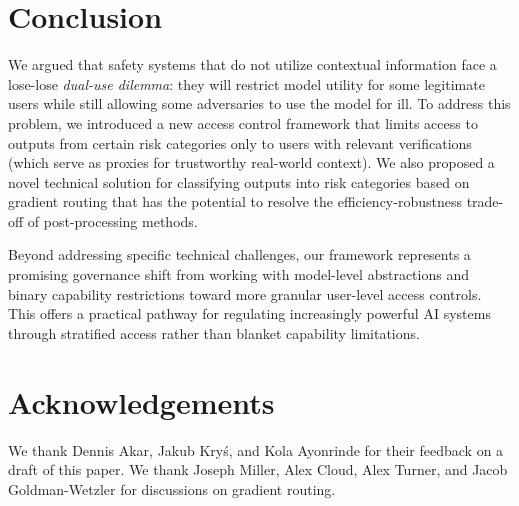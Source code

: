 \documentclass{article}
\theoremstyle{plain}
\theoremstyle{definition}
\theoremstyle{remark}
\begin{document}
\section{Conclusion}

We argued that safety systems that do not utilize contextual
information face a lose-lose \emph{dual-use dilemma}: they will
restrict model utility for some legitimate users while still allowing
some adversaries to use the model for ill. To address this problem,
we introduced a new access control framework that limits access to
outputs from certain risk categories only to users with relevant
verifications (which serve as proxies for trustworthy real-world
context). We also proposed a novel technical solution for classifying
outputs into risk categories based on gradient routing that has the
potential to resolve the efficiency-robustness trade-off of
post-processing methods.

Beyond addressing specific technical challenges, our framework
represents a promising governance shift from working with model-level
abstractions and binary capability restrictions toward more granular
user-level access controls. This offers a practical pathway for
regulating increasingly powerful AI systems through stratified access
rather than blanket capability limitations.

\section{Acknowledgements}

We thank Dennis Akar, Jakub Kryś, and Kola Ayonrinde for their feedback on a draft of this paper. We thank Joseph Miller, Alex Cloud, Alex Turner, and Jacob Goldman-Wetzler for discussions on gradient routing.




\newpage
\appendix
\onecolumn
\end{document}
